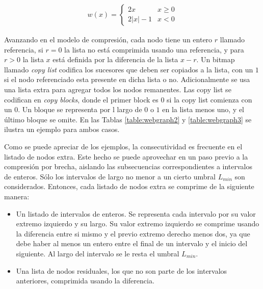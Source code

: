 \begin{align}
	w(x) =  \begin{cases}
					2x & x \geq 0 \\
					2|x| - 1 & x < 0
				\end{cases} 
\end{align}



Avanzando en el modelo de compresión, cada nodo tiene un entero $r$ llamado referencia, si $r = 0$ la lista no está comprimida usando una referencia, y para $r > 0$ la lista $x$ está definida por la diferencia de la lista $x - r$. Un bitmap llamado \textit{copy list} codifica los sucesores que deben ser copiados a la lista, con un $1$ si el nodo referenciado esta presente en dicha lista o no. Adicionalmente se usa una lista extra para agregar todos los nodos remanentes. Las copy list se codifican en \textit{copy blocks}, donde el primer block es $0$ si la copy list comienza con un $0$. Un bloque se representa por l largo de $0$ o $1$ en la lista menos uno, y el último bloque se omite. En las Tablas \ref{table:webgraph2} y \ref{table:webgraph3} se ilustra un ejemplo para ambos casos.





Como se puede apreciar de los ejemplos, la consecutividad es frecuente en el listado de nodos extra. Este hecho se puede aprovechar en un paso previo a la compresión por brecha, aislando las subsecuencias correspondientes a intervalos de enteros. Sólo los intervalos de largo no menor a un cierto umbral $L_{min}$ son considerados. Entonces, cada listado de nodos extra se comprime de la siguiente manera:

\begin{itemize}
	\item Un listado de intervalos de enteros. Se representa cada intervalo por su valor extremo izquierdo y su largo. Su valor extremo izquierdo se comprime usando la diferencia entre si mismo y el previo extremo derecho menos dos, ya que debe haber al menos un entero entre el final de un intervalo y el inicio del siguiente. Al largo del intervalo se le resta el umbral $L_{min}$.
	\item Una lista de nodos residuales, los que no son parte de los intervalos anteriores, comprimida usando la diferencia.
\end{itemize}



